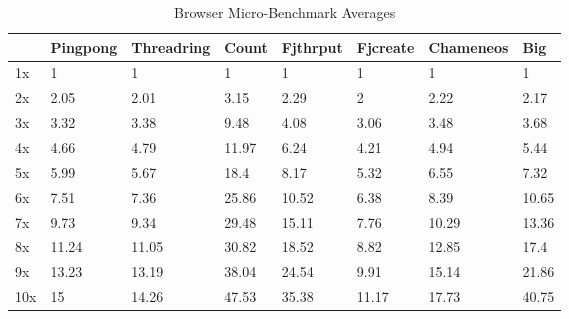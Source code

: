\documentclass[oneside]{um-fict}
\begin{document}
\begin{table}[H]
    \begin{center}
        \begin{tabular}{|l|lllllll|}
        \hline
        & Pingpong & Threadring & Count & Fjthrput & Fjcreate & Chameneos & Big   \\ \hline
        1x  & 1        & 1          & 1     & 1        & 1        & 1         & 1     \\
        2x  & 2.05     & 2.01       & 3.15  & 2.29     & 2        & 2.22      & 2.17  \\
        3x  & 3.32     & 3.38       & 9.48  & 4.08     & 3.06     & 3.48      & 3.68  \\
        4x  & 4.66     & 4.79       & 11.97 & 6.24     & 4.21     & 4.94      & 5.44  \\
        5x  & 5.99     & 5.67       & 18.4  & 8.17     & 5.32     & 6.55      & 7.32  \\
        6x  & 7.51     & 7.36       & 25.86 & 10.52    & 6.38     & 8.39      & 10.65 \\
        7x  & 9.73     & 9.34       & 29.48 & 15.11    & 7.76     & 10.29     & 13.36 \\
        8x  & 11.24    & 11.05      & 30.82 & 18.52    & 8.82     & 12.85     & 17.4  \\
        9x  & 13.23    & 13.19      & 38.04 & 24.54    & 9.91     & 15.14     & 21.86 \\
        10x & 15       & 14.26      & 47.53 & 35.38    & 11.17    & 17.73     & 40.75 \\ \hline
        \end{tabular}
        \caption{Browser Micro-Benchmark Averages}\label{tab:browserloadscalingavg}
    \end{center}
\end{table}
\end{document}
